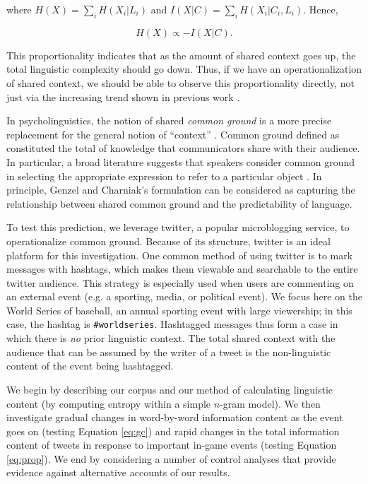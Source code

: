 \documentclass[11pt,letterpaper]{article}
\begin{document}
\noindent where $H(X) = \sum_i{H(X_i|L_i)}$ and $I(X|C) = \sum_i{H(X_i | C_i, L_i)}$. Hence,

\begin{equation}
\label{eq:prop}
H(X) \propto -I(X|C).
\end{equation}

\noindent This proportionality indicates that as the amount of shared context goes up, the total linguistic complexity should go down. Thus, if we have an operationalization of shared context, we should be able to observe this proportionality directly, not just via the increasing trend shown in previous work \cite{genzel2002,qian2012}. 

In psycholinguistics, the notion of shared \emph{common ground} is a more precise replacement for the general notion of ``context'' \cite{clark1996}. Common ground defined as constituted the total of knowledge that communicators share with their audience. In particular, a broad literature suggests that speakers consider common ground in selecting the appropriate expression to refer to a particular object \cite{brennan1996,metzing2003}. In principle, Genzel and Charniak's formulation can be considered as capturing the relationship between shared common ground and the predictability of language. 

To test this prediction, we leverage twitter, a popular microblogging service, to operationalize common ground. Because of its structure, twitter is an ideal platform for this investigation. One common method of using twitter is to mark messages with hashtags, which makes them viewable and searchable to the entire twitter audience. This strategy is especially used when users are commenting on an external event (e.g. a sporting, media, or political event). We focus here on the World Series of baseball, an annual sporting event with large viewership; in this case, the hashtag is \texttt{\#worldseries}. Hashtagged messages thus form a case in which there is \emph{no} prior linguistic context. The total shared context with the audience that can be assumed by the writer of a tweet is the non-linguistic content of the event being hashtagged. 

We begin by describing our corpus and our method of calculating linguistic content (by computing entropy within a simple $n$-gram model). We then investigate gradual changes in word-by-word information content as the event goes on (testing Equation \ref{eq:gc}) and rapid changes in the total information content of tweets in response to important in-game events (testing Equation \ref{eq:prop}). We end by considering a number of control analyses that provide evidence against alternative accounts of our results. 
\end{document}
